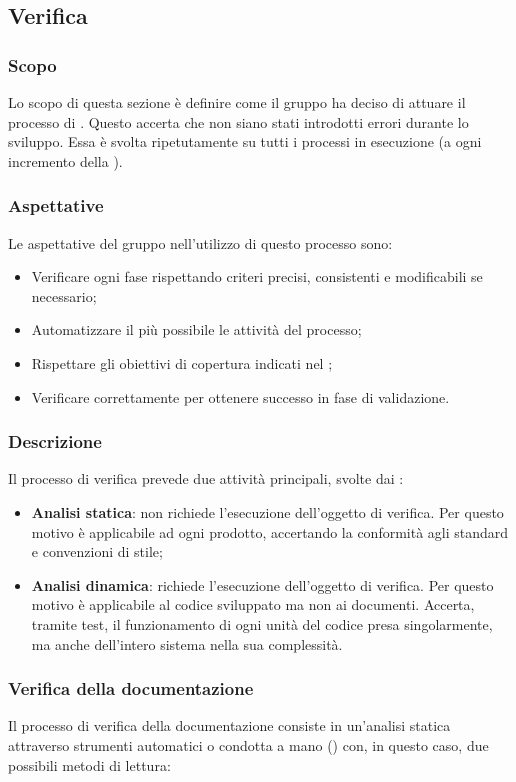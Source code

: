 \subsection{Verifica}
\subsubsection{Scopo}
Lo scopo di questa sezione è definire come il gruppo ha deciso di attuare il processo di . Questo accerta che non siano stati introdotti errori durante lo sviluppo. Essa è svolta ripetutamente su tutti i processi in esecuzione (a ogni incremento della ).

\subsubsection{Aspettative}
Le aspettative del gruppo \Gruppo{} nell'utilizzo di questo processo sono:
\begin{itemize}
	\item Verificare ogni fase rispettando criteri precisi, consistenti e modificabili se necessario;
	\item Automatizzare il più possibile le attività del processo;
	\item Rispettare gli obiettivi di copertura indicati nel \PdQv{};
	\item Verificare correttamente per ottenere successo in fase di validazione.
\end{itemize}

\subsubsection{Descrizione}
Il processo di verifica prevede due attività principali, svolte dai :
\begin{itemize}
	\item \textbf{Analisi statica}: non richiede l'esecuzione dell'oggetto di verifica. Per questo motivo è applicabile ad ogni prodotto, accertando la conformità agli standard e convenzioni di stile;
	\item \textbf{Analisi dinamica}: richiede l'esecuzione dell'oggetto di verifica. Per questo motivo è applicabile al codice sviluppato ma non ai documenti. Accerta, tramite test, il funzionamento di ogni unità del codice presa singolarmente, ma anche dell'intero sistema nella sua complessità.
\end{itemize}

\subsubsection{Verifica della documentazione}
Il processo di verifica della documentazione consiste in un'analisi statica attraverso strumenti automatici o condotta a mano () con, in questo caso, due possibili metodi di lettura:   

